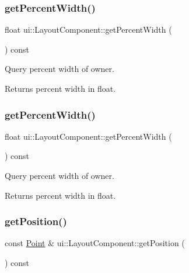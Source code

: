 \subsubsection{\texorpdfstring{get\+Percent\+Width()}{getPercentWidth()}\hspace{0.1cm}{\footnotesize\ttfamily [1/2]}}
{\footnotesize\ttfamily float ui\+::\+Layout\+Component\+::get\+Percent\+Width (\begin{DoxyParamCaption}{ }\end{DoxyParamCaption}) const}

Query percent width of owner. \begin{DoxyReturn}{Returns}
percent width in float. 
\end{DoxyReturn}
\mbox{\label{classui_1_1LayoutComponent_a79288b7cb4520b1f81ab76b2541f7209}} 
\subsubsection{\texorpdfstring{get\+Percent\+Width()}{getPercentWidth()}\hspace{0.1cm}{\footnotesize\ttfamily [2/2]}}
{\footnotesize\ttfamily float ui\+::\+Layout\+Component\+::get\+Percent\+Width (\begin{DoxyParamCaption}{ }\end{DoxyParamCaption}) const}

Query percent width of owner. \begin{DoxyReturn}{Returns}
percent width in float. 
\end{DoxyReturn}
\mbox{\label{classui_1_1LayoutComponent_a2879ddfdc6a4e4101499d27e6024854b}} 
\subsubsection{\texorpdfstring{get\+Position()}{getPosition()}\hspace{0.1cm}{\footnotesize\ttfamily [1/2]}}
{\footnotesize\ttfamily const \hyperlink{classVec2}{Point} \& ui\+::\+Layout\+Component\+::get\+Position (\begin{DoxyParamCaption}{ }\end{DoxyParamCaption}) const}

